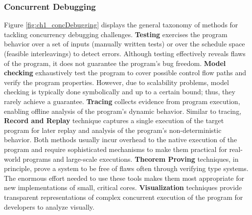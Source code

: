 \subsubsection{Concurrent Debugging}
Figure \ref{fig:ch1_concDebugging} displays the general taxonomy of methods for tackling concurrency debugging challenges.
%
\textbf{Testing} exercises the program behavior over a set of inputs (manually written tests) or over the schedule space (feasible interleavings) to detect errors. Although testing effectively reveals flaws of the program, it does not guarantee the program's bug freedom.
\textbf{Model checking} exhaustively test the program to cover possible control flow paths and verify the program properties. However, due to scalability problems, model checking is typically done symbolically and up to a certain bound; thus, they rarely achieve a guarantee.
\textbf{Tracing} collects evidence from program execution, enabling offline analysis of the program's dynamic behavior. Similar to tracing, \textbf{Record and Replay} technique captures a single execution of the target program for later replay and analysis of the program's non-deterministic behavior. Both methods usually incur overhead to the native execution of the program and require sophisticated mechanisms to make them practical for real-world programs and large-scale executions. \textbf{Theorem Proving} techniques, in principle, prove a system to be free of flaws often through verifying type systems. The enormous effort needed to use these tools makes them most appropriate for new implementations of small, critical cores. \textbf{Visualization} techniques provide transparent representations of complex concurrent execution of the program for developers to analyze visually.

